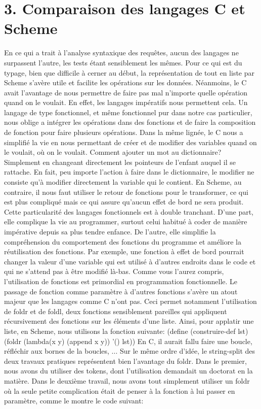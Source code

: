 \documentclass[french]{article}
\begin{document}
		\section{3. Comparaison des langages C et Scheme}
				En ce qui a trait à l'analyse syntaxique des requêtes, aucun des langages ne surpassent l'autre, les tests étant sensiblement les mêmes. Pour ce qui est du typage, bien que difficile à cerner au début, la représentation de tout en liste par Scheme s'avère utile et facilite les opérations sur les données. Néanmoins, le C avait l'avantage de nous permettre de faire pas mal n'importe quelle opération quand on le voulait. En effet, les langages impératifs nous permettent cela. Un langage de type fonctionnel, et même fonctionnel pur dans notre cas particulier, nous oblige a intégrer les opérations dans des fonctions et de faire la composition de fonction pour faire plusieurs opérations.
				Dans la même lignée, le C nous a simplifié la vie en nous permettant de créer et de modifier des variables quand on le voulait, où on le voulait. Comment ajouter un mot au dictionnaire? Simplement en changeant directement les pointeurs de l'enfant auquel il se rattache. En fait, peu importe l'action à faire  dans le dictionnaire, le modifier ne consiste qu'à modifier directement la variable qui le contient. En Scheme, au contraire, il nous faut utiliser le retour de fonctions pour le transformer, ce qui est plus compliqué mais ce qui assure qu'aucun effet de bord ne sera produit. Cette particularité des langages fonctionnels est à double tranchant. D'une part, elle complique la vie au programmer, surtout celui habitué à coder de manière impérative depuis sa plus tendre enfance. De l'autre, elle simplifie la compréhension du comportement des fonctions du programme et améliore la réutilisation des fonctions. Par exemple, une fonction à effet de bord pourrait changer la valeur d'une variable qui est utilisé à d'autres endroits dans le code et qui ne s'attend pas à être modifié là-bas.
				Comme vous l'aurez compris, l'utilisation de fonctions est primordial en programmation fonctionnelle. Le passage de fonction comme paramètre à d'autres fonctions s'avère un atout majeur que les langages comme C n'ont pas. Ceci permet notamment l'utilisation de foldr et de foldl, deux fonctions sensiblement pareilles qui appliquent récursivement des fonctions sur les éléments d'une liste. Ainsi, pour applatir une liste, en Scheme, nous utilisons la fonction suivante:
				(define (construire-def lst)
						(foldr
							(lambda(x y) (append x y))
							'()
							lst))
				En C, il aurait fallu faire une boucle, réfléchir aux bornes de la boucles, ...
				Sur le même ordre d'idée, le string-split des deux travaux pratiques représentent bien l'avantage du foldr. Dans le premier, nous avons du utiliser des tokens, dont l'utilisation demandait un doctorat en la matière. Dans le deuxième travail, nous avons tout simplement utiliser un foldr où la seule petite complication était de penser à la fonction à lui passer en paramètre, comme le montre le code suivant:
				
\end{document}
